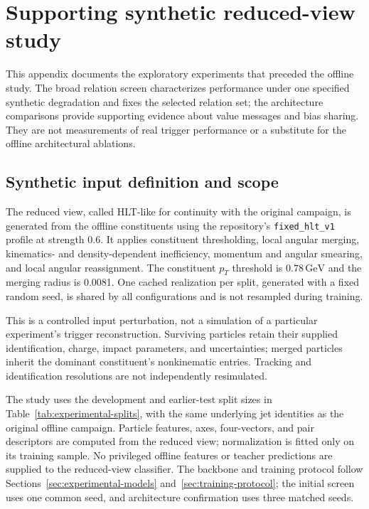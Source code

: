 \section{Supporting synthetic reduced-view study}
\label{sec:hlt-support}
\label{sec:supporting-results}

This appendix documents the exploratory experiments that preceded the
offline study. The broad relation screen characterizes performance under
one specified synthetic degradation and fixes the selected relation set;
the architecture comparisons provide supporting evidence about value
messages and bias sharing. They are not measurements of real trigger
performance or a substitute for the offline architectural ablations.

\subsection{Synthetic input definition and scope}
\label{sec:hlt-inputs}

The reduced view, called HLT-like for continuity with the original
campaign, is generated from the offline constituents using the
repository's \texttt{fixed\_hlt\_v1} profile at strength 0.6. It applies
constituent thresholding, local angular merging, kinematics- and
density-dependent inefficiency, momentum and angular smearing, and local
angular reassignment. The constituent $p_T$ threshold is
$0.78\,\mathrm{GeV}$ and the merging radius is 0.0081. One cached
realization per split, generated with a fixed random seed, is shared by all
configurations and is not resampled during training.

This is a controlled input perturbation, not a simulation of a particular
experiment's trigger reconstruction. Surviving particles retain their
supplied identification, charge, impact parameters, and uncertainties;
merged particles inherit the dominant constituent's nonkinematic entries.
Tracking and identification resolutions are not independently resimulated.

The study uses the development and earlier-test split sizes in
Table~\ref{tab:experimental-splits}, with the same underlying jet identities
as the original offline campaign. Particle features, axes, four-vectors,
and pair descriptors are computed from the reduced view; normalization is
fitted only on its training sample. No privileged offline features or
teacher predictions are supplied to the reduced-view classifier.
The backbone and training protocol follow Sections~\ref{sec:experimental-models}
and~\ref{sec:training-protocol}; the initial screen uses one common seed,
and architecture confirmation uses three matched seeds.

